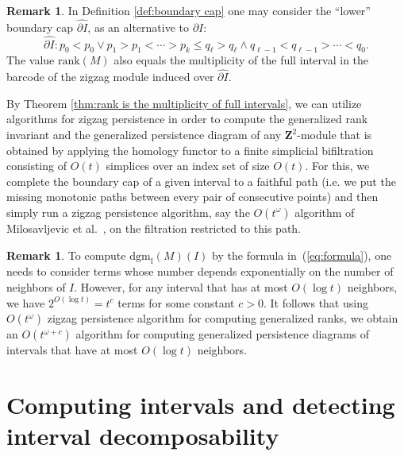 \documentclass[11pt]{article}
\theoremstyle{definition}
\newtheorem{remark}[theorem]{Remark}
\newcommand{\intdgm}{\mathrm{dgm}_{\mathbb{I}}}
\newcommand{\rank}{\mathrm{rank}}
\newcommand{\NN}{t}
\newcommand{\Z}{\mathbf{Z}}
\begin{document}
\begin{remark}\label{rem:lower boundary cap}
In Definition \ref{def:boundary cap} one may consider the ``lower'' boundary cap $\widehat{\partial I}$, as an alternative to $\partial I$: \[\widehat{\partial I}: p_0<p_0\vee p_1>p_1<\cdots>p_k\leq q_{\ell}>q_{\ell}\wedge q_{\ell-1} <q_{\ell-1}>\cdots<q_0.\]
The value $\rank(M)$ also equals the multiplicity of the  full interval in the barcode of the  zigzag module induced over $\widehat{\partial I}$.
\end{remark}


By Theorem \ref{thm:rank is the multiplicity of full intervals}, we can utilize algorithms for zigzag persistence  in order to compute the generalized rank invariant and the generalized persistence diagram of any $\Z^2$-module that is obtained by applying the homology functor to a finite simplicial bifiltration consisting of $O(\NN)$ simplices over an index set of size $O(t)$. For this, we complete the boundary cap of a given interval to a faithful path (i.e. we put the missing monotonic paths between every pair of consecutive points) and then simply run a zigzag persistence algorithm, say the  $O(\NN^\omega)$ algorithm of Milosavljevic et al.~\cite{milosavljevic2011zigzag}, on the filtration
restricted to this path.

\begin{remark}
To compute  $\intdgm(M)(I)$ by the formula in~(\ref{eq:formula}), one needs to consider terms whose number depends exponentially on the number of neighbors of $I$.
However, for any interval that has at most $O(\log \NN)$ neighbors, we have $2^{O(\log \NN)}=\NN^c$ terms for some
constant $c>0$. It follows that using $O(\NN^{\omega})$ zigzag persistence algorithm for computing generalized ranks, we obtain
an $O(\NN^{\omega+c})$ algorithm for computing generalized persistence diagrams of intervals that have at most $O(\log \NN)$ neighbors.
\end{remark}


\section{Computing intervals and detecting interval decomposability}\label{sec:computing interval summands and detecting interval decomposability}
\end{document}
